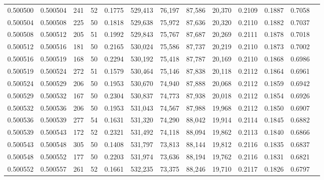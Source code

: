 \begin{tabular}{rrrrrrrrrrrrr}
0.500500 & 0.500504 & 241 &  52 &                                     0.1775 & 529,413 &  76,197 &  87,586 &  20,370 & 0.2109 & 0.1887 & 0.7058 \\
0.500504 & 0.500508 & 225 &  50 &                                     0.1818 & 529,638 &  75,972 &  87,636 &  20,320 & 0.2110 & 0.1882 & 0.7037 \\
0.500508 & 0.500512 & 205 &  51 &                                     0.1992 & 529,843 &  75,767 &  87,687 &  20,269 & 0.2111 & 0.1878 & 0.7018 \\
0.500512 & 0.500516 & 181 &  50 &                                     0.2165 & 530,024 &  75,586 &  87,737 &  20,219 & 0.2110 & 0.1873 & 0.7002 \\
0.500516 & 0.500519 & 168 &  50 &                                     0.2294 & 530,192 &  75,418 &  87,787 &  20,169 & 0.2110 & 0.1868 & 0.6986 \\
0.500519 & 0.500524 & 272 &  51 &                                     0.1579 & 530,464 &  75,146 &  87,838 &  20,118 & 0.2112 & 0.1864 & 0.6961 \\
0.500524 & 0.500529 & 206 &  50 &                                     0.1953 & 530,670 &  74,940 &  87,888 &  20,068 & 0.2112 & 0.1859 & 0.6942 \\
0.500529 & 0.500532 & 167 &  50 &                                     0.2304 & 530,837 &  74,773 &  87,938 &  20,018 & 0.2112 & 0.1854 & 0.6926 \\
0.500532 & 0.500536 & 206 &  50 &                                     0.1953 & 531,043 &  74,567 &  87,988 &  19,968 & 0.2112 & 0.1850 & 0.6907 \\
0.500536 & 0.500539 & 277 &  54 &                                     0.1631 & 531,320 &  74,290 &  88,042 &  19,914 & 0.2114 & 0.1845 & 0.6882 \\
0.500539 & 0.500543 & 172 &  52 &                                     0.2321 & 531,492 &  74,118 &  88,094 &  19,862 & 0.2113 & 0.1840 & 0.6866 \\
0.500543 & 0.500548 & 305 &  50 &                                     0.1408 & 531,797 &  73,813 &  88,144 &  19,812 & 0.2116 & 0.1835 & 0.6837 \\
0.500548 & 0.500552 & 177 &  50 &                                     0.2203 & 531,974 &  73,636 &  88,194 &  19,762 & 0.2116 & 0.1831 & 0.6821 \\
0.500552 & 0.500557 & 261 &  52 &                                     0.1661 & 532,235 &  73,375 &  88,246 &  19,710 & 0.2117 & 0.1826 & 0.6797 \\

\end{tabular}

